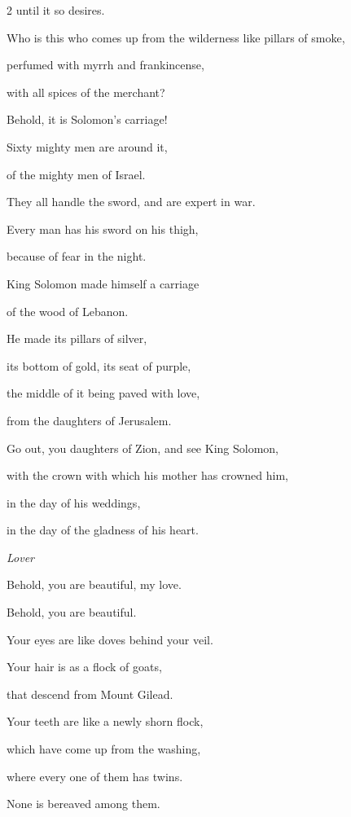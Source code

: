 \begin{multicols}{2}
until it so desires.

\vspace{\baselineskip} 

\myverse{}Who is this who comes up from the wilderness like pillars of smoke,

perfumed with myrrh and frankincense,

with all spices of the merchant?

\myverse{}Behold, it is Solomon’s carriage!

Sixty mighty men are around it,

of the mighty men of Israel.

\myverse{}They all handle the sword, and are expert in war.

Every man has his sword on his thigh,

because of fear in the night.


\vspace{\baselineskip}

 \myverse{}King Solomon made himself a carriage

of the wood of Lebanon.

\myverse{}He made its pillars of silver,

its bottom of gold, its seat of purple,

the middle of it being paved with love,

from the daughters of Jerusalem.

\myverse{}Go out, you daughters of Zion, and see King Solomon,

with the crown with which his mother has crowned him,

in the day of his weddings,

in the day of the gladness of his heart.


\mychapter{}\textit{Lover}

\myverse*{}Behold, you are beautiful, my love.

Behold, you are beautiful.

Your eyes are like doves behind your veil.

Your hair is as a flock of goats,

that descend from Mount Gilead.

\myverse{}Your teeth are like a newly shorn flock,

which have come up from the washing,

where every one of them has twins.

None is bereaved among them.


\end{multicols}
